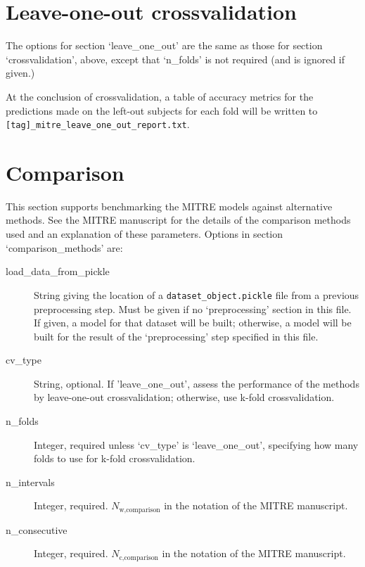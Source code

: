 \documentclass[12pt]{report}
\begin{document}
\section{Leave-one-out crossvalidation}\label{leave_one_out}
The options for section `leave\_one\_out' are the same as those for
section `crossvalidation', above, except that `n\_folds' is not
required (and is ignored if given.)

At the conclusion of crossvalidation, a table of accuracy metrics for
the predictions made on the left-out subjects for each fold will be
written to \texttt{[tag]\_mitre\_leave\_one\_out\_report.txt}.


\section{Comparison}\label{comparison_methods}
This section supports benchmarking the MITRE models against
alternative methods.  See the MITRE manuscript for the details of the
comparison methods used and an explanation of these parameters.  Options
in section `comparison\_methods' are:
\begin{description}
\item[load\_data\_from\_pickle] String giving the location of a
  \texttt{dataset\_object.pickle} file from a previous preprocessing
  step. Must be given if no `preprocessing' section in this file. If
  given, a model for that dataset will be built; otherwise, a model
  will be built for the result of the `preprocessing' step specified
  in this file.
\item[cv\_type] String, optional. If 'leave\_one\_out', assess the performance
  of the methods by leave-one-out crossvalidation; otherwise,
  use k-fold crossvalidation.
\item[n\_folds] Integer, required unless `cv\_type' is `leave\_one\_out',
  specifying how many folds to use for k-fold crossvalidation.
\item[n\_intervals] Integer, required. $N_\text{w,comparison}$ in the
  notation of the MITRE manuscript.
\item[n\_consecutive] Integer, required. $N_\text{c,comparison}$ in
  the notation of the MITRE manuscript.
\end{description}
\end{document}
